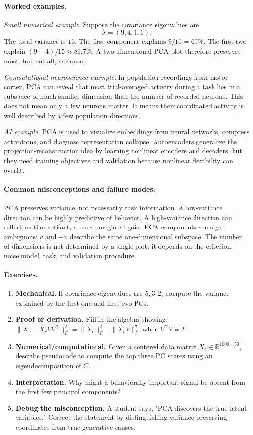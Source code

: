 \paragraph{Worked examples.}
\emph{Small numerical example.}
Suppose the covariance eigenvalues are
\[
\lambda=(9,4,1,1).
\]
The total variance is \(15\). The first component explains \(9/15=60\%\). The first two explain \((9+4)/15\approx 86.7\%\). A two-dimensional PCA plot therefore preserves most, but not all, variance.

\emph{Computational neuroscience example.}
In population recordings from motor cortex, PCA can reveal that most trial-averaged activity during a task lies in a subspace of much smaller dimension than the number of recorded neurons. This does not mean only a few neurons matter. It means their coordinated activity is well described by a few population directions.

\emph{AI example.}
PCA is used to visualize embeddings from neural networks, compress activations, and diagnose representation collapse. Autoencoders generalize the projection-reconstruction idea by learning nonlinear encoders and decoders, but they need training objectives and validation because nonlinear flexibility can overfit.

\paragraph{Common misconceptions and failure modes.}
PCA preserves variance, not necessarily task information. A low-variance direction can be highly predictive of behavior. A high-variance direction can reflect motion artifact, arousal, or global gain. PCA components are sign-ambiguous: \(v\) and \(-v\) describe the same one-dimensional subspace. The number of dimensions is not determined by a single plot; it depends on the criterion, noise model, task, and validation procedure.

\paragraph{Exercises.}
\begin{enumerate}[label=\textbf{48.2.\arabic*.}, leftmargin=*]
\item \textbf{Mechanical.} If covariance eigenvalues are \(5,3,2\), compute the variance explained by the first one and first two PCs.
\item \textbf{Proof or derivation.} Fill in the algebra showing \(\|X_c-X_cVV^\top\|_F^2=\|X_c\|_F^2-\|X_cV\|_F^2\) when \(V^\top V=I\).
\item \textbf{Numerical/computational.} Given a centered data matrix \(X_c\in\mathbb R^{1000\times 50}\), describe pseudocode to compute the top three PC scores using an eigendecomposition of \(C\).
\item \textbf{Interpretation.} Why might a behaviorally important signal be absent from the first few principal components?
\item \textbf{Debug the misconception.} A student says, "PCA discovers the true latent variables." Correct the statement by distinguishing variance-preserving coordinates from true generative causes.
\end{enumerate}

